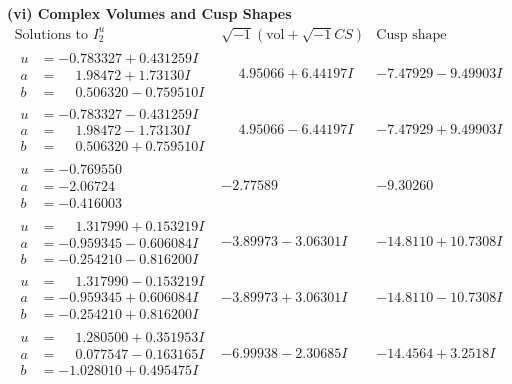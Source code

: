 \documentclass[1p]{elsarticle_modified}
\theoremstyle{definition}
\newcommand{\I}{\sqrt{-1}}
\begin{document}
\newpage\flushleft \textbf{(vi) Complex Volumes and Cusp Shapes}
$$\begin{array}{c|c|c}  
\text{Solutions to }I^u_{2}& \I (\text{vol} + \sqrt{-1}CS) & \text{Cusp shape}\\
 \hline 
\begin{aligned}
u &= -0.783327 + 0.431259 I \\
a &= \phantom{-}1.98472 + 1.73130 I \\
b &= \phantom{-}0.506320 - 0.759510 I\end{aligned}
 & \phantom{-}4.95066 + 6.44197 I & -7.47929 - 9.49903 I \\ \hline\begin{aligned}
u &= -0.783327 - 0.431259 I \\
a &= \phantom{-}1.98472 - 1.73130 I \\
b &= \phantom{-}0.506320 + 0.759510 I\end{aligned}
 & \phantom{-}4.95066 - 6.44197 I & -7.47929 + 9.49903 I \\ \hline\begin{aligned}
u &= -0.769550\phantom{ +0.000000I} \\
a &= -2.06724\phantom{ +0.000000I} \\
b &= -0.416003\phantom{ +0.000000I}\end{aligned}
 & -2.77589\phantom{ +0.000000I} & -9.30260\phantom{ +0.000000I} \\ \hline\begin{aligned}
u &= \phantom{-}1.317990 + 0.153219 I \\
a &= -0.959345 - 0.606084 I \\
b &= -0.254210 - 0.816200 I\end{aligned}
 & -3.89973 - 3.06301 I & -14.8110 + 10.7308 I \\ \hline\begin{aligned}
u &= \phantom{-}1.317990 - 0.153219 I \\
a &= -0.959345 + 0.606084 I \\
b &= -0.254210 + 0.816200 I\end{aligned}
 & -3.89973 + 3.06301 I & -14.8110 - 10.7308 I \\ \hline\begin{aligned}
u &= \phantom{-}1.280500 + 0.351953 I \\
a &= \phantom{-}0.077547 - 0.163165 I \\
b &= -1.028010 + 0.495475 I\end{aligned}
 & -6.99938 - 2.30685 I & -14.4564 + 3.2518 I \\ \hline\begin{aligned}

\end{aligned}
\end{array}$$
\end{document}

